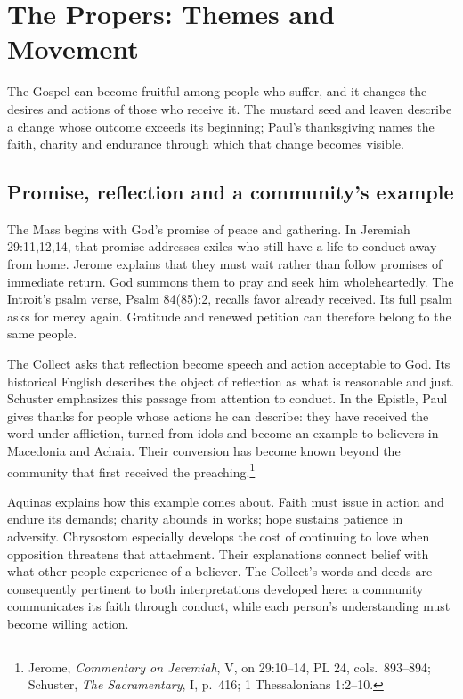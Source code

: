 \section{The Propers: Themes and Movement}

The Gospel can become fruitful among people who suffer, and it changes the desires and actions of those who receive it. The mustard seed and leaven describe a change whose outcome exceeds its beginning; Paul's thanksgiving names the faith, charity and endurance through which that change becomes visible.

\subsection{Promise, reflection and a community's example}

The Mass begins with God's promise of peace and gathering. In Jeremiah 29:11,12,14, that promise addresses exiles who still have a life to conduct away from home. Jerome explains that they must wait rather than follow promises of immediate return. God summons them to pray and seek him wholeheartedly. The Introit's psalm verse, Psalm 84(85):2, recalls favor already received. Its full psalm asks for mercy again. Gratitude and renewed petition can therefore belong to the same people.

The Collect asks that reflection become speech and action acceptable to God. Its historical English describes the object of reflection as what is reasonable and just. Schuster emphasizes this passage from attention to conduct. In the Epistle, Paul gives thanks for people whose actions he can describe: they have received the word under affliction, turned from idols and become an example to believers in Macedonia and Achaia. Their conversion has become known beyond the community that first received the preaching.\footnote{Jerome, \textit{Commentary on Jeremiah}, V, on 29:10--14, PL 24, cols.~893--894; Schuster, \textit{The Sacramentary}, I, p.~416; 1 Thessalonians 1:2--10.}

Aquinas explains how this example comes about. Faith must issue in action and endure its demands; charity abounds in works; hope sustains patience in adversity. Chrysostom especially develops the cost of continuing to love when opposition threatens that attachment. Their explanations connect belief with what other people experience of a believer. The Collect's words and deeds are consequently pertinent to both interpretations developed here: a community communicates its faith through conduct, while each person's understanding must become willing action.

